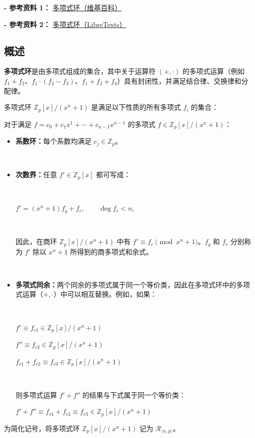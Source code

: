 \textbf{- 参考资料 1：}
\href{https://en.wikipedia.org/wiki/Polynomial_ring}{多项式环（维基百科）}~\cite{polynomial-ring}

\noindent \textbf{- 参考资料 2：}
\href{https://math.libretexts.org/Bookshelves/Combinatorics_and_Discrete_Mathematics/Applied_Discrete_Structures_(Doerr_and_Levasseur)/16%3A_An_Introduction_to_Rings_and_Fields/16.03%3A_Polynomial_Rings}{多项式环（LibreTexts）}~\cite{polynomial-rings}

\subsection{概述}
\label{subsec:poly-ring-overview}

\textbf{多项式环}是由多项式组成的集合，其中关于运算符 $(+, \cdot)$ 的多项式运算（例如 $f_1 + f_2$、$f_1 \cdot (f_2 - f_3)$、$f_1 + f_2 + f_4$）具有封闭性，并满足结合律、交换律和分配律。


多项式环 ${\mathbb{Z}_p[x] / (x^n + 1)}$ 是满足以下性质的所有多项式 $f_i$ 的集合：

\begin{tcolorbox}[title={\textbf{\tboxlabel{\ref*{subsec:poly-ring-overview}} 环}}]

对于满足 $f = c_0 + c_1x^1 + \cdots + c_{n-1}x^{n-1}$ 的多项式 $f \in \mathbb{Z}_p[x] / (x^n + 1)$：

\begin{itemize}
\item \textbf{系数环：}每个系数均满足 $c_j \in \mathbb{Z}_p$。

$ $

\item \textbf{次数界：}任意 $f' \in \mathbb{Z}_p[x]$ 都可写成：

$ $

$f'=(x^n+1)f_q+f_r,\qquad \deg f_r < n,$

$ $

因此，在商环 $\mathbb{Z}_p[x]/(x^n+1)$ 中有 $f' \equiv f_r \pmod{x^n+1}$。$f_q$ 和 $f_r$ 分别称为 $f'$ 除以 $x^n + 1$ 所得到的商多项式和余式。

$ $

\item \textbf{多项式同余：}两个同余的多项式属于同一个等价类，因此在多项式环中的多项式运算（$+, \cdot$）中可以相互替换。例如，如果：

$ $

$f' \equiv f_{r1} \in \mathbb{Z}_p[x] / (x^n + 1)$

$f{''} \equiv f_{r2} \in \mathbb{Z}_p[x] / (x^n + 1)$

$f_{r1} + f_{r2} \equiv f_{r3} \in \mathbb{Z}_p[x] / (x^n + 1)$

$ $

则多项式运算 $f' + f''$ 的结果与下式属于同一个等价类：

$f' + f'' \equiv f_{r1} + f_{r2} \equiv f_{r3} \in \mathbb{Z}_p[x] / (x^n + 1)$


\end{itemize}

为简化记号，将多项式环 $\mathbb{Z}_p[x] / (x^n + 1)$ 记为 $\mathcal{R}_{\langle n, p \rangle}$。
\end{tcolorbox}

